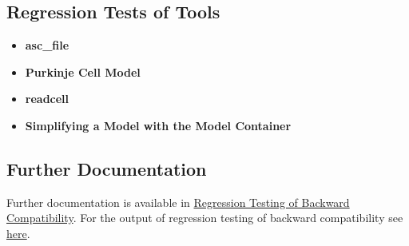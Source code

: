 \documentclass[12pt]{article}
\begin{document}
\subsection*{Regression Tests of Tools}
   \begin{itemize}
     \item[]{\bf asc\_file}
     \item[]{\bf Purkinje Cell Model}
     \item[]{\bf readcell}
     \item[]{\bf Simplifying a Model with the Model Container}
   \end{itemize}
   
\subsection*{Further Documentation}

Further documentation is available in \href{../tests-backward compatibility/tests-backward compatibility.tex}{Regression Testing of Backward Compatibility}. For the output of regression testing of backward compatibility see \href{http://neurospaces.sourceforge.net/neurospaces_project/ns-sli/tests/html/index.html}{here}.
\end{document}
